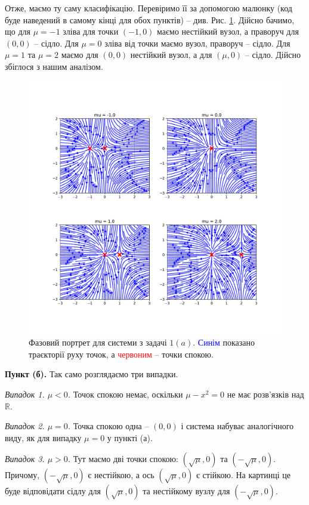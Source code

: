 \documentclass[oneside,solution]{tmpl}
\begin{document}
Отже, маємо ту саму класифікацію. Перевіримо її за допомогою малюнку (код буде наведений в самому кінці для обох пунктів) -- див. Рис. \ref{fig:problem_1a}. Дійсно бачимо, що для $\mu = -1$ зліва для точки $(-1,0)$ маємо нестійкий вузол, а праворуч для $(0,0)$ -- сідло. Для $\mu=0$ зліва від точки маємо вузол, праворуч -- сідло. Для $\mu=1$ та $\mu=2$ маємо для $(0, 0)$ нестійкий вузол, а для $(\mu, 0)$ -- сідло. Дійсно збіглося з нашим аналізом.

\begin{figure}
    \centering
    \includegraphics[width=\textwidth]{images/test/problem_1a.pdf}
    \caption{Фазовий портрет для системи з задачі $1(a)$. \textcolor{blue}{Синім} показано траєкторії руху точок, а \textcolor{red}{червоним} -- точки спокою.}
    \label{fig:problem_1a}
\end{figure}

\textbf{Пункт (б).} Так само розглядаємо три випадки.

\textit{Випадок 1. $\mu < 0$.} Точок спокою немає, оскільки $\mu - x^2 = 0$ не має розв'язків над $\mathbb{R}$. 

\textit{Випадок 2. $\mu=0$.} Точка спокою одна -- $(0,0)$ і система набуває аналогічного виду, як для випадку $\mu=0$ у пункті (а).

\textit{Випадок 3. $\mu > 0$.} Тут маємо дві точки спокою: $(\sqrt{\mu},0)$ та $(-\sqrt{\mu},0)$. Причому, $(-\sqrt{\mu},0)$ є нестійкою, а ось $(\sqrt{\mu},0)$ є стійкою. На картинці це буде відповідати сідлу для $(\sqrt{\mu},0)$ та нестійкому вузлу для $(-\sqrt{\mu}, 0)$. 
\end{document}
